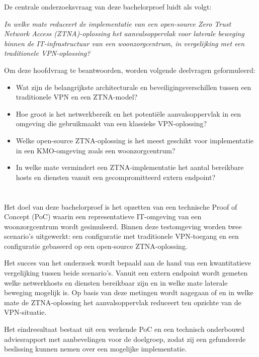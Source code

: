 De centrale onderzoeksvraag van deze bachelorproef luidt als volgt:

\textit{In welke mate reduceert de implementatie van een open-source Zero Trust Network Access (ZTNA)-oplossing het aanvalsoppervlak voor laterale beweging binnen de IT-infrastructuur van een woonzorgcentrum, in vergelijking met een traditionele VPN-oplossing?}

Om deze hoofdvraag te beantwoorden, worden volgende deelvragen geformuleerd:

\begin{itemize}
	\item Wat zijn de belangrijkste architecturale en beveiligingsverschillen tussen een traditionele VPN en een ZTNA-model?
	\item Hoe groot is het netwerkbereik en het potentiële aanvalsoppervlak in een omgeving die gebruikmaakt van een klassieke VPN-oplossing?
	\item Welke open-source ZTNA-oplossing is het meest geschikt voor implementatie in een KMO-omgeving zoals een woonzorgcentrum?
	\item In welke mate vermindert een ZTNA-implementatie het aantal bereikbare hosts en diensten vanuit een gecompromitteerd extern endpoint?
\end{itemize}

\section{}%
\label{sec:onderzoeksdoelstelling}

Het doel van deze bachelorproef is het opzetten van een technische Proof of Concept (PoC) waarin een representatieve IT-omgeving van een woonzorgcentrum wordt gesimuleerd. Binnen deze testomgeving worden twee scenario’s uitgewerkt: een configuratie met traditionele VPN-toegang en een configuratie gebaseerd op een open-source ZTNA-oplossing.

Het succes van het onderzoek wordt bepaald aan de hand van een kwantitatieve vergelijking tussen beide scenario’s. Vanuit een extern endpoint wordt gemeten welke netwerkhosts en diensten bereikbaar zijn en in welke mate laterale beweging mogelijk is. Op basis van deze metingen wordt nagegaan of en in welke mate de ZTNA-oplossing het aanvalsoppervlak reduceert ten opzichte van de VPN-situatie.

Het eindresultaat bestaat uit een werkende PoC en een technisch onderbouwd adviesrapport met aanbevelingen voor de doelgroep, zodat zij een gefundeerde beslissing kunnen nemen over een mogelijke implementatie.

